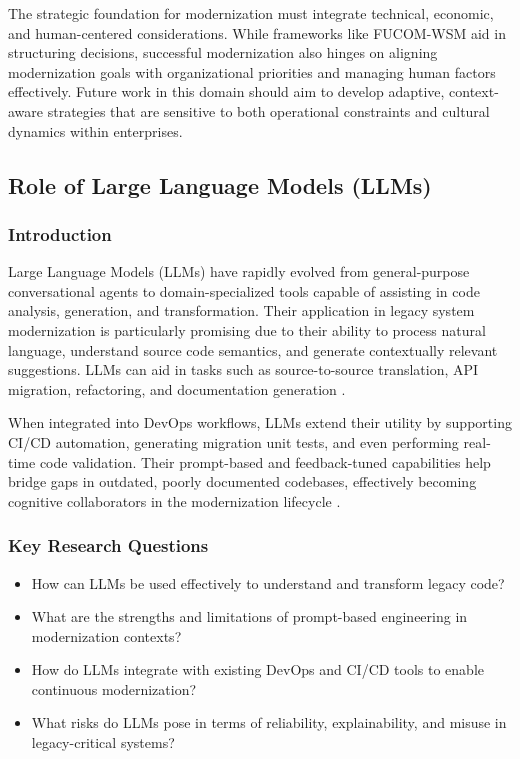 \documentclass[12pt]{article}
\begin{document}
The strategic foundation for modernization must integrate technical, economic, and human-centered considerations. While frameworks like FUCOM-WSM aid in structuring decisions, successful modernization also hinges on aligning modernization goals with organizational priorities and managing human factors effectively. Future work in this domain should aim to develop adaptive, context-aware strategies that are sensitive to both operational constraints and cultural dynamics within enterprises.

\subsection{Role of Large Language Models (LLMs)}

\subsubsection{Introduction}

Large Language Models (LLMs) have rapidly evolved from general-purpose conversational agents to domain-specialized tools capable of assisting in code analysis, generation, and transformation. Their application in legacy system modernization is particularly promising due to their ability to process natural language, understand source code semantics, and generate contextually relevant suggestions. LLMs can aid in tasks such as source-to-source translation, API migration, refactoring, and documentation generation \cite{talasila2023, sato2024}.

When integrated into DevOps workflows, LLMs extend their utility by supporting CI/CD automation, generating migration unit tests, and even performing real-time code validation. Their prompt-based and feedback-tuned capabilities help bridge gaps in outdated, poorly documented codebases, effectively becoming cognitive collaborators in the modernization lifecycle \cite{llmigrate2025, googlemigrate2025}.

\subsubsection{Key Research Questions}

\begin{itemize}
    \item How can LLMs be used effectively to understand and transform legacy code?
    \item What are the strengths and limitations of prompt-based engineering in modernization contexts?
    \item How do LLMs integrate with existing DevOps and CI/CD tools to enable continuous modernization?
    \item What risks do LLMs pose in terms of reliability, explainability, and misuse in legacy-critical systems?
\end{itemize}
\end{document}
